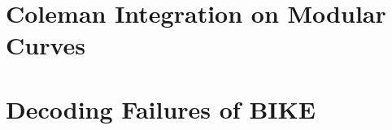 \documentclass[12pt,chapterheads]{ucsd}
\theoremstyle{definition}
\begin{document}
%







%   
%   
%


\part{Coleman Integration on Modular Curves}


%
%
%










\part{Decoding Failures of BIKE}










\singlespace  %
\end{document}
